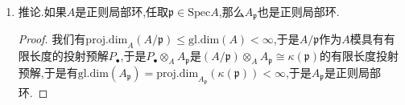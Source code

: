 \begin{enumerate}
\begin{proof}
    	\qquad
    	
    	我们接下来断言典范同态$\mathfrak{m}/x\mathfrak{m}\to\mathfrak{m}/xA$分裂,由于$x\not\in\mathfrak{m}^2$,我们可以取$\mathfrak{m}$的一组生成元$x_1=x,x_2,\cdots,x_s$,这里$s$是$A$的嵌入维数.记$\mathfrak{b}=(x_2,\cdots,x_s)$,如果$ax\in\mathfrak{b}\cap xA$,那么它在$\mathfrak{m}/\mathfrak{m}^2$的像$\overline{a}\overline{x}$就必须是零,所以$a\in\mathfrak{m}$,所以$\mathfrak{b}\cap xA\subseteq x\mathfrak{m}$,于是我们得到如下复合为恒等的映射链:
    	$$\mathfrak{m}/xA\cong(\mathfrak{b}+xA)/xA\cong\mathfrak{b}/(\mathfrak{b}\cap xA)\to\mathfrak{b}/x\mathfrak{m}\to\mathfrak{m}/x\mathfrak{m}\to\mathfrak{m}/xA$$
    	
    	于是我们的断言是成立的,于是$\mathfrak{m}/xA$是$\mathfrak{m}/x\mathfrak{m}$的直和项,于是$\mathrm{proj.dim}_B(\mathfrak{m}/xA)\le\mathrm{proj.dim}_B(\mathfrak{m}/x\mathfrak{m})\le r$.考虑短正合列$0\to\mathfrak{m}/xA\to B\to k\to0$,得到$\mathrm{gl.dim}(B)=\mathrm{proj.dim}(k)\le r+1$有限.另外$B$的嵌入维数是$s-1$,归纳假设导致$B$是正则局部环,按照$x$是$A$正则元,于是$\dim A=\dim B+1=s$,完成归纳.
    \end{proof}
    \item 推论.如果$A$是正则局部环,任取$\mathfrak{p}\in\mathrm{Spec}A$,那么$A_{\mathfrak{p}}$也是正则局部环.
    \begin{proof}
    	
    	我们有$\mathrm{proj.dim}_A(A/\mathfrak{p})\le\mathrm{gl.dim}(A)<\infty$,于是$A/\mathfrak{p}$作为$A$模具有有限长度的投射预解$P_{\bullet}$,于是$P_{\bullet}\otimes_AA_{\mathfrak{p}}$是$(A/\mathfrak{p})\otimes_AA_{\mathfrak{p}}\cong\kappa(\mathfrak{p})$的有限长度投射预解,于是有$\mathrm{gl.dim}(A_{\mathfrak{p}})=\mathrm{proj.dim}_{A_{\mathfrak{p}}}(\kappa(\mathfrak{p}))<\infty$,于是$A_{\mathfrak{p}}$是正则局部环.
    \end{proof}
\end{enumerate}


